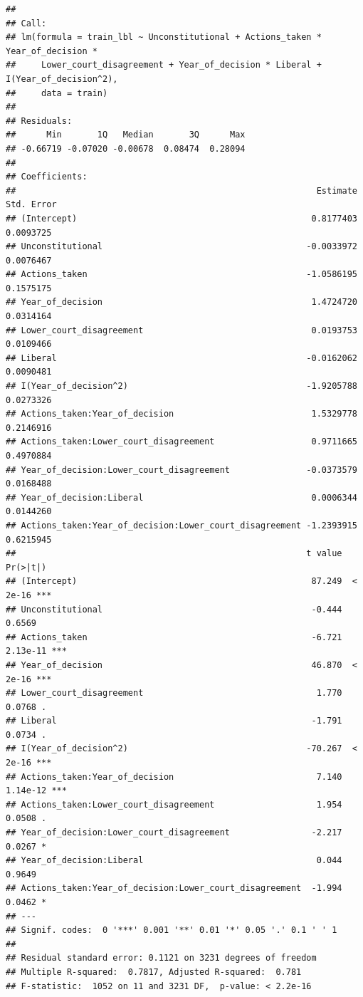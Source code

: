 \documentclass[
]{article}
\begin{document}
\begin{verbatim}
## 
## Call:
## lm(formula = train_lbl ~ Unconstitutional + Actions_taken * Year_of_decision * 
##     Lower_court_disagreement + Year_of_decision * Liberal + I(Year_of_decision^2), 
##     data = train)
## 
## Residuals:
##      Min       1Q   Median       3Q      Max 
## -0.66719 -0.07020 -0.00678  0.08474  0.28094 
## 
## Coefficients:
##                                                           Estimate Std. Error
## (Intercept)                                              0.8177403  0.0093725
## Unconstitutional                                        -0.0033972  0.0076467
## Actions_taken                                           -1.0586195  0.1575175
## Year_of_decision                                         1.4724720  0.0314164
## Lower_court_disagreement                                 0.0193753  0.0109466
## Liberal                                                 -0.0162062  0.0090481
## I(Year_of_decision^2)                                   -1.9205788  0.0273326
## Actions_taken:Year_of_decision                           1.5329778  0.2146916
## Actions_taken:Lower_court_disagreement                   0.9711665  0.4970884
## Year_of_decision:Lower_court_disagreement               -0.0373579  0.0168488
## Year_of_decision:Liberal                                 0.0006344  0.0144260
## Actions_taken:Year_of_decision:Lower_court_disagreement -1.2393915  0.6215945
##                                                         t value Pr(>|t|)    
## (Intercept)                                              87.249  < 2e-16 ***
## Unconstitutional                                         -0.444   0.6569    
## Actions_taken                                            -6.721 2.13e-11 ***
## Year_of_decision                                         46.870  < 2e-16 ***
## Lower_court_disagreement                                  1.770   0.0768 .  
## Liberal                                                  -1.791   0.0734 .  
## I(Year_of_decision^2)                                   -70.267  < 2e-16 ***
## Actions_taken:Year_of_decision                            7.140 1.14e-12 ***
## Actions_taken:Lower_court_disagreement                    1.954   0.0508 .  
## Year_of_decision:Lower_court_disagreement                -2.217   0.0267 *  
## Year_of_decision:Liberal                                  0.044   0.9649    
## Actions_taken:Year_of_decision:Lower_court_disagreement  -1.994   0.0462 *  
## ---
## Signif. codes:  0 '***' 0.001 '**' 0.01 '*' 0.05 '.' 0.1 ' ' 1
## 
## Residual standard error: 0.1121 on 3231 degrees of freedom
## Multiple R-squared:  0.7817, Adjusted R-squared:  0.781 
## F-statistic:  1052 on 11 and 3231 DF,  p-value: < 2.2e-16
\end{verbatim}
\end{document}
